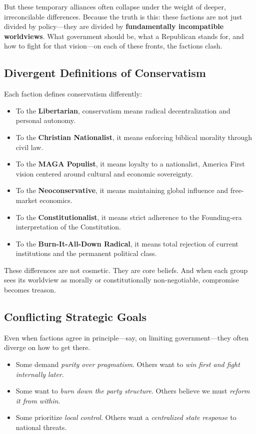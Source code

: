 But these temporary alliances often collapse under the weight of deeper, irreconcilable differences. Because the truth is this: these factions are not just divided by policy—they are divided by \textbf{fundamentally incompatible worldviews}. What government should be, what a Republican stands for, and how to fight for that vision—on each of these fronts, the factions clash.

\subsection{Divergent Definitions of Conservatism}
Each faction defines conservatism differently:
\begin{itemize}
\item To the \textbf{Libertarian}, conservatism means radical decentralization and personal autonomy.
\item To the \textbf{Christian Nationalist}, it means enforcing biblical morality through civil law.
\item To the \textbf{MAGA Populist}, it means loyalty to a nationalist, America First vision centered around cultural and economic sovereignty.
\item To the \textbf{Neoconservative}, it means maintaining global influence and free-market economics.
\item To the \textbf{Constitutionalist}, it means strict adherence to the Founding-era interpretation of the Constitution.
\item To the \textbf{Burn-It-All-Down Radical}, it means total rejection of current institutions and the permanent political class.
\end{itemize}

These differences are not cosmetic. They are core beliefs. And when each group sees its worldview as morally or constitutionally non-negotiable, compromise becomes treason.

\subsection{Conflicting Strategic Goals}
Even when factions agree in principle—say, on limiting government—they often diverge on how to get there.
\begin{itemize}
\item Some demand \textit{purity over pragmatism}. Others want to \textit{win first and fight internally later}.
\item Some want to \textit{burn down the party structure}. Others believe we must \textit{reform it from within}.
\item Some prioritize \textit{local control}. Others want a \textit{centralized state response} to national threats.
\end{itemize}

